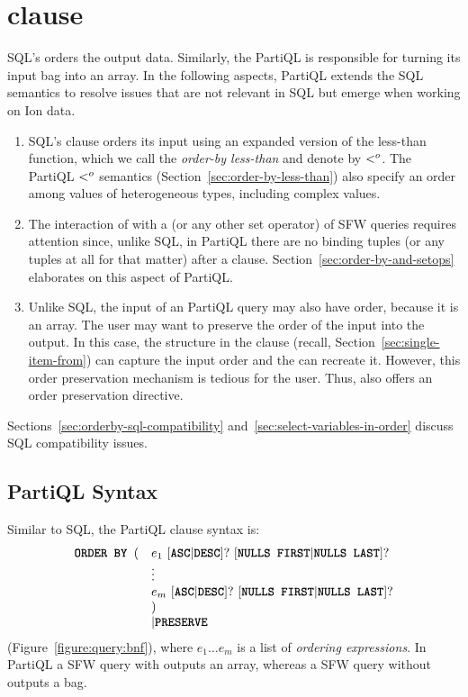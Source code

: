 \section{ clause}
\label{section:order-by}
SQL's  orders the output data. Similarly, the PartiQL 
is responsible for turning its input bag into an array. In the following
aspects, PartiQL extends the SQL semantics to resolve issues that are not
relevant in SQL but emerge when working on Ion data.
%
\begin{enumerate}
%
\item SQL's  clause orders its input using an expanded version of
the less-than function, which we call the {\em order-by less-than} and denote by
$<^o$. The PartiQL $<^o$ semantics (Section~\ref{sec:order-by-less-than})
also specify an order among values of heterogeneous types, including complex
values.
%
\item The interaction of  with a  (or any other set
operator) of SFW queries requires attention since, unlike SQL, in PartiQL there
are no binding tuples (or any tuples at all for that matter) after a  clause. Section~\ref{sec:order-by-and-setops} elaborates on this aspect
of PartiQL.
%
\item Unlike SQL, the input of an PartiQL query may also have order, because it
is an array. The user may want to preserve the order of the input into the
output. In this case, the  structure in the  clause (recall,
Section~\ref{sec:single-item-from}) can capture the input order and the
 can recreate it. However, this order preservation mechanism is
tedious for the user. Thus,  also offers an order preservation
directive. 
%
\end{enumerate}

Sections~\ref{sec:orderby-sql-compatibility}
and~\ref{sec:select-variables-in-order} discuss SQL compatibility issues.


\subsection{PartiQL  Syntax}
\label{sec:orderby-syntax}
Similar to SQL, the PartiQL  clause syntax is: 
\[
\begin{array}{ll}
\texttt{\textbf{ORDER BY }}( & e_1\ [\texttt{\textbf{ASC}} | \texttt{\textbf{DESC}}]?\ [\texttt{\textbf{NULLS FIRST}}|\texttt{\textbf{NULLS LAST}}]? \\
 & \vdots \\
 & e_m\ [\texttt{\textbf{ASC}} | \texttt{\textbf{DESC}}]?\ [\texttt{\textbf{NULLS FIRST}}|\texttt{\textbf{NULLS LAST}}]? \\
 &) \\
 &| \texttt{\textbf{PRESERVE}}
\end{array}
\] 
\noindent (Figure~\ref{figure:query:bnf}), where $e_1 \ldots e_m$ is a list of
\textit{ordering expressions}.  In PartiQL a SFW query with 
outputs an array, whereas a SFW query without  outputs a bag. 

